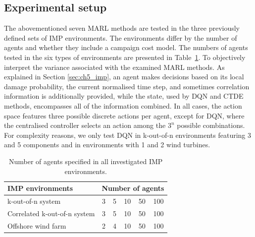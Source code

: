 \subsection{Experimental setup}

The abovementioned seven MARL methods are tested in the three previously defined sets of IMP environments.
The environments differ by the number of agents and whether they include a campaign cost model.
The numbers of agents tested in the six types of environments are presented in Table~\ref{tab:experiments_details}.
To objectively interpret the variance associated with the examined MARL methods.
As explained in Section \ref{sec:ch5_imp}, an agent makes decisions based on its local damage probability, the current normalised time step, and sometimes correlation information is additionally provided, while the state, used by DQN and CTDE methods, encompasses all of the information combined.
In all cases, the action space features three possible discrete actions per agent, except for DQN, where the centralised controller selects an action among the $3^n$ possible combinations.
For complexity reasons, we only test DQN in k-out-of-n environments featuring 3 and 5 components and in environments with 1 and 2 wind turbines.

\begin{table}
\centering
\begin{tabular}{lccccc}
\toprule
IMP environments & \multicolumn{5}{l}{Number of agents}  \\
\midrule
k-out-of-n system & 3 & 5 & 10 & 50 & 100 \\
 Correlated k-out-of-n system & 3 & 5 & 10 & 50 & 100 \\
 Offshore wind farm & 2 & 4 & 10 & 50 & 100  \\
\bottomrule
\end{tabular}
\caption{Number of agents specified in all investigated IMP environments.}
\label{tab:experiments_details}
\end{table}

